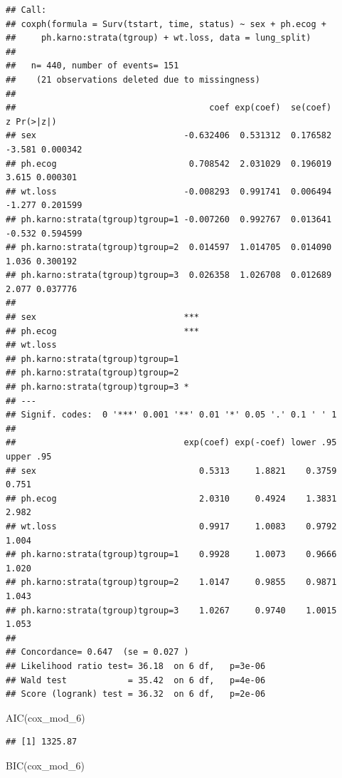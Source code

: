 \documentclass[
]{article}
\newenvironment{Shaded}{\begin{snugshade}}{\end{snugshade}}
\newcommand{\FunctionTok}[1]{\textcolor[rgb]{0.00,0.00,0.00}{#1}}
\newcommand{\NormalTok}[1]{#1}
\begin{document}
\begin{verbatim}
## Call:
## coxph(formula = Surv(tstart, time, status) ~ sex + ph.ecog + 
##     ph.karno:strata(tgroup) + wt.loss, data = lung_split)
## 
##   n= 440, number of events= 151 
##    (21 observations deleted due to missingness)
## 
##                                      coef exp(coef)  se(coef)      z Pr(>|z|)
## sex                             -0.632406  0.531312  0.176582 -3.581 0.000342
## ph.ecog                          0.708542  2.031029  0.196019  3.615 0.000301
## wt.loss                         -0.008293  0.991741  0.006494 -1.277 0.201599
## ph.karno:strata(tgroup)tgroup=1 -0.007260  0.992767  0.013641 -0.532 0.594599
## ph.karno:strata(tgroup)tgroup=2  0.014597  1.014705  0.014090  1.036 0.300192
## ph.karno:strata(tgroup)tgroup=3  0.026358  1.026708  0.012689  2.077 0.037776
##                                    
## sex                             ***
## ph.ecog                         ***
## wt.loss                            
## ph.karno:strata(tgroup)tgroup=1    
## ph.karno:strata(tgroup)tgroup=2    
## ph.karno:strata(tgroup)tgroup=3 *  
## ---
## Signif. codes:  0 '***' 0.001 '**' 0.01 '*' 0.05 '.' 0.1 ' ' 1
## 
##                                 exp(coef) exp(-coef) lower .95 upper .95
## sex                                0.5313     1.8821    0.3759     0.751
## ph.ecog                            2.0310     0.4924    1.3831     2.982
## wt.loss                            0.9917     1.0083    0.9792     1.004
## ph.karno:strata(tgroup)tgroup=1    0.9928     1.0073    0.9666     1.020
## ph.karno:strata(tgroup)tgroup=2    1.0147     0.9855    0.9871     1.043
## ph.karno:strata(tgroup)tgroup=3    1.0267     0.9740    1.0015     1.053
## 
## Concordance= 0.647  (se = 0.027 )
## Likelihood ratio test= 36.18  on 6 df,   p=3e-06
## Wald test            = 35.42  on 6 df,   p=4e-06
## Score (logrank) test = 36.32  on 6 df,   p=2e-06
\end{verbatim}

\begin{Shaded}
\begin{Highlighting}[]
\FunctionTok{AIC}\NormalTok{(cox\_mod\_6)}
\end{Highlighting}
\end{Shaded}

\begin{verbatim}
## [1] 1325.87
\end{verbatim}

\begin{Shaded}
\begin{Highlighting}[]
\FunctionTok{BIC}\NormalTok{(cox\_mod\_6)}
\end{Highlighting}
\end{Shaded}
\end{document}
